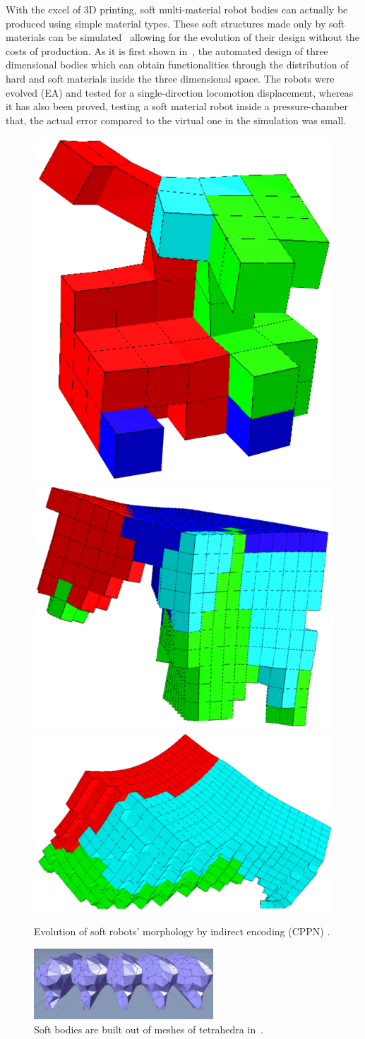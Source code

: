 With the excel of $3$D printing, soft multi-material robot bodies can actually be produced using simple material types. These soft structures made only by soft materials can be simulated~\citep{hiller2012dynamic} allowing for the evolution of their design without the costs of production. As it is first shown in~\citep{hiller2012automatic}, the automated design of three dimensional bodies which can obtain functionalities through the distribution of hard and soft materials inside the three dimensional space. The robots were evolved (EA) and tested for a single-direction locomotion displacement, whereas it has also been proved, testing a soft material robot inside a pressure-chamber that, the actual error compared to the virtual one in the simulation was small.

\begin{figure}[t!]
\centering
\includegraphics[height=0.2\textwidth]{../Figures/Misc/unshacklingEvolutionFigure1.png}\hspace{0.4cm}
\includegraphics[height=0.2\textwidth]{../Figures/Misc/unshacklingEvolutionFigure2.png}\hspace{0.4cm}
\includegraphics[height=0.2\textwidth]{../Figures/Misc/unshacklingEvolutionFigure3.png}
\caption{Evolution of soft robots' morphology by indirect encoding (CPPN) \citep{cheney2013unshackling}.}
\label{fig:unschackling}
\end{figure}


\begin{figure}[b!]
\centering
\includegraphics[width=0.6\textwidth]{../Figures/Misc/meshSoft1.png}
\caption{Soft bodies are built out of meshes of tetrahedra in~\citep{rieffel2014growing}.}
\label{fig:meshSoft}
\end{figure}

